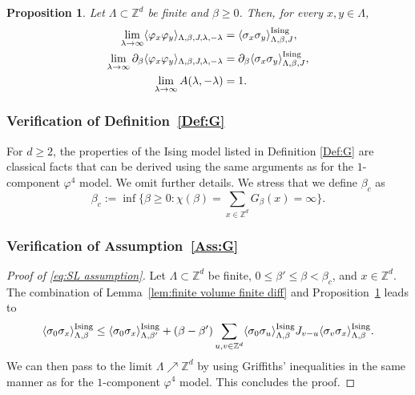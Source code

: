 \documentclass[11pt,a4paper]{article}
\numberwithin{equation}{section}
\theoremstyle{plain}
\newtheorem{Prop}[Thm]{Proposition}
\theoremstyle{definition}
\newcommand\1{\mathds{1}}
\begin{document}
\begin{Prop}\label{prop:cv of phi4 to Ising} Let $\Lambda\subset \mathbb Z^d$ be finite and $\beta\geq 0$. Then, for every $x,y\in \Lambda$,
\begin{align}
    \lim_{\lambda \to \infty}
	\langle \varphi_x\varphi_y\rangle_{\Lambda,\beta,J,\lambda,-\lambda}
&=\langle \sigma_x\sigma_y\rangle_{\Lambda,\beta,J}^{\rm Ising},
	\\
\lim_{\lambda \to \infty}
	\partial_\beta\langle \varphi_x\varphi_y\rangle_{\Lambda,\beta,J,\lambda,-\lambda}&
=\partial_\beta\langle \sigma_x\sigma_y\rangle_{\Lambda,\beta,J}^{\rm Ising},
	\\
\lim_{\lambda \to \infty} A(\lambda,-\lambda)&=1.
\end{align}

\end{Prop}

	
\subsubsection{Verification of Definition~\ref{Def:G}}

For $d\geq 2$, the properties of the Ising model listed in Definition \ref{Def:G} are classical facts that
can be derived using the same arguments as for the $1$-component $\varphi^4$ model.
We omit further details.
We stress that we
define $\beta_c$ as
\begin{equation}
\beta_c:=\inf\Big\{\beta \geq 0: \chi(\beta)=\sum_{x\in \mathbb Z^d}G_\beta(x)=\infty\Big\}.
\end{equation}



\subsubsection{Verification of Assumption~\ref{Ass:G}}

\begin{proof}[Proof of \eqref{eq:SL assumption}] Let $\Lambda\subset \mathbb Z^d$ be finite, $0\leq \beta'\leq \beta<\beta_c$, and $x\in \mathbb Z^d$.
The combination of Lemma~\ref{lem:finite volume finite diff} and Proposition~\ref{prop:cv of phi4 to Ising} leads to
\begin{equation}
	\langle \sigma_0\sigma_x\rangle_{\Lambda,\beta}^{\rm Ising}\leq \langle \sigma_0\sigma_x\rangle_{\Lambda,\beta'}^{\rm Ising}+(\beta-\beta')\sum_{u,v\in \mathbb Z^d}\langle \sigma_0\sigma_u\rangle_{\Lambda,\beta}^{\rm Ising}J_{v-u}\langle \sigma_v\sigma_x\rangle_{\Lambda,\beta}^{\rm Ising}.
\end{equation}
We can then pass to the limit $\Lambda\nearrow \mathbb Z^d$ by using Griffiths' inequalities in the same manner as for the $1$-component $\varphi^4$ model. This concludes the proof.
\end{proof}
\end{document}
